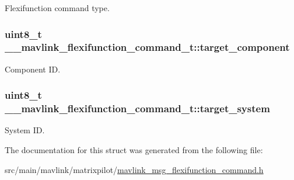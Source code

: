 Flexifunction command type. 

\hypertarget{struct____mavlink__flexifunction__command__t_adce2945a81ff12330230a7b9a284d965}{
\subsubsection[{target\+\_\+component}]{\setlength{\rightskip}{0pt plus 5cm}uint8\+\_\+t \+\_\+\+\_\+mavlink\+\_\+flexifunction\+\_\+command\+\_\+t\+::target\+\_\+component}}\label{struct____mavlink__flexifunction__command__t_adce2945a81ff12330230a7b9a284d965}


Component I\+D. 

\hypertarget{struct____mavlink__flexifunction__command__t_ab4990eb2808bcc3181ce8a6523fa9871}{
\subsubsection[{target\+\_\+system}]{\setlength{\rightskip}{0pt plus 5cm}uint8\+\_\+t \+\_\+\+\_\+mavlink\+\_\+flexifunction\+\_\+command\+\_\+t\+::target\+\_\+system}}\label{struct____mavlink__flexifunction__command__t_ab4990eb2808bcc3181ce8a6523fa9871}


System I\+D. 



The documentation for this struct was generated from the following file\+:\begin{DoxyCompactItemize}
\item 
src/main/mavlink/matrixpilot/\hyperlink{mavlink__msg__flexifunction__command_8h}{mavlink\+\_\+msg\+\_\+flexifunction\+\_\+command.\+h}\end{DoxyCompactItemize}

